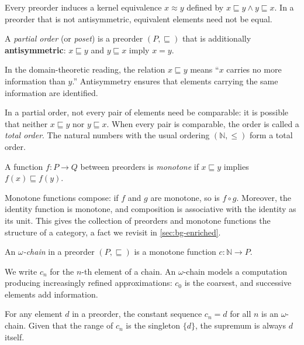Every preorder induces a kernel equivalence $x \approx y$ defined by
$x \sqsubseteq y \land y \sqsubseteq x$. In a preorder that is not
antisymmetric, equivalent elements need not be equal.

\begin{definition}
\label{def:partial-order}
A \emph{partial order} (or \emph{poset}) is a preorder $(P, \sqsubseteq)$
that is additionally \textbf{antisymmetric}: $x \sqsubseteq y$ and
$y \sqsubseteq x$ imply $x = y$.
\end{definition}

In the domain-theoretic reading, the relation $x \sqsubseteq y$ means
``$x$ carries no more information than $y$.'' Antisymmetry ensures that
elements carrying the same information are identified.

In a partial order, not every pair of elements need be comparable: it is
possible that neither $x \sqsubseteq y$ nor $y \sqsubseteq x$. When every
pair is comparable, the order is called a \emph{total order}. The natural
numbers with the usual ordering $(\mathbb{N}, \le)$ form a total order.

\begin{definition}
\label{def:monotone}
A function $f : P \to Q$ between preorders is \emph{monotone} if
$x \sqsubseteq y$ implies $f(x) \sqsubseteq f(y)$.
\end{definition}

Monotone functions compose: if $f$ and $g$ are monotone, so is
$f \circ g$. Moreover, the identity function is monotone, and
composition is associative with the identity as its unit. This gives
the collection of preorders and monotone functions the structure of a
category, a fact we revisit in \cref{sec:bg-enriched}.

\begin{definition}
\label{def:omega-chain}
An \emph{$\omega$-chain} in a preorder $(P, \sqsubseteq)$ is a monotone
function $c : \mathbb{N} \to P$.
\end{definition}

We write $c_n$ for the $n$-th element of a chain. An $\omega$-chain
models a computation producing increasingly refined approximations:
$c_0$ is the coarsest, and successive elements add information.

\begin{example}
\label{ex:constant-chain}
For any element $d$ in a preorder, the constant sequence $c_n = d$ for
all $n$ is an $\omega$-chain. Given that the range of $c_n$ is the singleton
$\{d\}$, the supremum is always $d$ itself.
\end{example}

